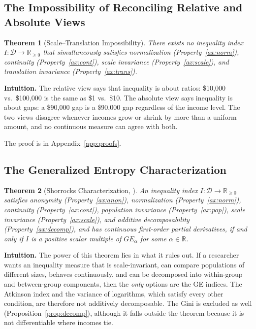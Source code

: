 \documentclass[12pt]{article}
\theoremstyle{plain}
\newtheorem{theorem}{Theorem}
\theoremstyle{definition}
\theoremstyle{remark}
\newcommand{\R}{\mathbb{R}}
\newcommand{\D}{\mathcal{D}}
\begin{document}
\subsection{The Impossibility of Reconciling Relative and Absolute Views}

\begin{theorem}[Scale--Translation Impossibility]\label{thm:impossibility}
There exists no inequality index $I : \D \to \R_{\geq 0}$ that simultaneously satisfies normalization (Property~\ref{ax:norm}), continuity (Property~\ref{ax:cont}), scale invariance (Property~\ref{ax:scale}), and translation invariance (Property~\ref{ax:trans}).
\end{theorem}

\textbf{Intuition.}
The relative view says that inequality is about ratios: \$10{,}000 vs.\ \$100{,}000 is the same as \$1 vs.\ \$10.
The absolute view says inequality is about gaps: a \$90{,}000 gap is a \$90{,}000 gap regardless of the income level.
The two views disagree whenever incomes grow or shrink by more than a uniform amount, and no continuous measure can agree with both.

The proof is in Appendix~\ref{app:proofs}.

\subsection{The Generalized Entropy Characterization}

\begin{theorem}[Shorrocks Characterization, \citealp{Shorrocks1980}]\label{thm:shorrocks}
An inequality index $I : \D \to \R_{\geq 0}$ satisfies anonymity (Property~\ref{ax:anon}), normalization (Property~\ref{ax:norm}), continuity (Property~\ref{ax:cont}), population invariance (Property~\ref{ax:pop}), scale invariance (Property~\ref{ax:scale}), and additive decomposability (Property~\ref{ax:decomp}), and has continuous first-order partial derivatives, if and only if $I$ is a positive scalar multiple of $GE_\alpha$ for some $\alpha \in \R$.
\end{theorem}

\textbf{Intuition.}
The power of this theorem lies in what it rules out.
If a researcher wants an inequality measure that is scale-invariant, can compare populations of different sizes, behaves continuously, and can be decomposed into within-group and between-group components, then the \emph{only} options are the GE indices.
The Atkinson index and the variance of logarithms, which satisfy every other condition, are therefore not additively decomposable.
The Gini is excluded as well (Proposition~\ref{prop:decomp}), although it falls outside the theorem because it is not differentiable where incomes tie.
\end{document}
